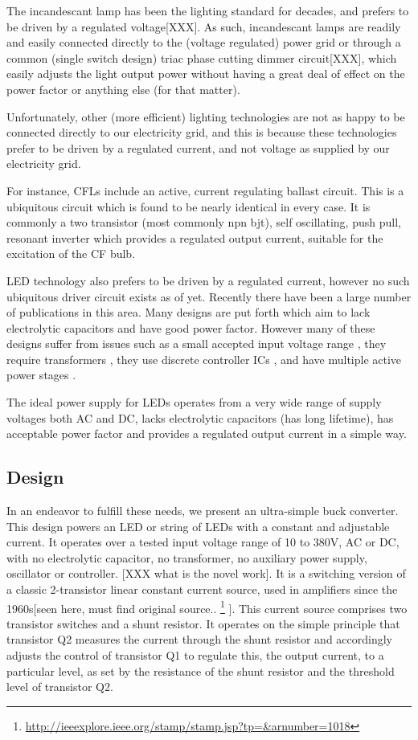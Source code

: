 \documentclass[conference]{IEEEtran}
\begin{document}
The incandescant lamp has been the lighting standard for decades, and prefers to be driven by a regulated voltage[XXX]. As such, incandescant lamps are readily and easily connected directly to the (voltage regulated) power grid or through a common (single switch design) triac phase cutting dimmer circuit[XXX], which easily adjusts the light output power without having a great deal of effect on the power factor or anything else (for that matter). 

Unfortunately, other (more efficient) lighting technologies are not as happy to be connected directly to our electricity grid, and this is because these technologies prefer to be driven by a regulated current, and not voltage as supplied by our electricity grid.

For instance, CFLs include an active, current regulating ballast circuit. This is a ubiquitous circuit which is found to be nearly identical in every case. It is commonly a two transistor (most commonly npn bjt), self oscillating, push pull, resonant inverter which provides a regulated output current, suitable for the excitation of the CF bulb.

LED technology also prefers to be driven by a regulated current, however no such ubiquitous driver circuit exists as of yet. Recently there have been a large number of publications in this area. Many designs are put forth which aim to lack electrolytic capacitors and have good power factor. However many of these designs suffer from issues such as a small accepted input voltage range \cite{tianfu2007improved}, they require transformers \cite{chen2012elimination}, they use discrete controller ICs \cite{gu2009means}, and have multiple active power stages \cite{wang2012flicker}. 

The ideal power supply for LEDs operates from a very wide range of supply voltages both AC and DC, lacks electrolytic capacitors (has long lifetime), has acceptable power factor and provides a regulated output current in a simple way.


\subsection{Design}
In an endeavor to fulfill these needs, we present an ultra-simple buck converter. This design powers an LED or string of LEDs with a constant and adjustable current. It operates over a tested input voltage range of 10 to 380V, AC or DC, with no electrolytic capacitor, no transformer, no auxiliary power supply, oscillator or controller. [XXX what is the novel work]. It is a switching version of a classic 2-transistor linear constant current source, used in amplifiers since the 1960s[seen here, must find original source.. 
\footnote{\url{http://ieeexplore.ieee.org/stamp/stamp.jsp?tp=&arnumber=1018}}
]. This current source comprises two transistor switches and a shunt resistor. It operates on the simple principle that transistor Q2 measures the current through the shunt resistor and accordingly adjusts the control of transistor Q1 to regulate this, the output current, to a particular level, as set by the resistance of the shunt resistor and the threshold level of transistor Q2.
\end{document}
